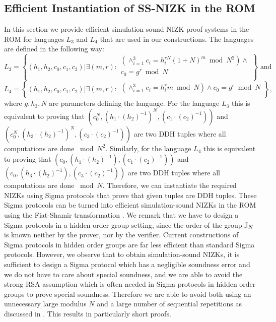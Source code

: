 \subsection{Efficient Instantiation of SS-NIZK in the ROM}\label{sec:nizk} 
In this section we provide efficient simulation sound NIZK proof systems in the ROM for languages $L_3$ and $L_4$ that are used in our constructions. The languages are defined in the following way:
\[
L_3 = \left\{(h_1, h_2, c_0, c_1, c_2)| \exists (m,r):
\begin{aligned}
       (\land_{i=1}^3 c_i = h_i^{rN}(1+N)^m \bmod N^2) \land \\
       c_0 = g^r \bmod N\\
    \end{aligned}
    \right\} \text{ and }
\]
\[
L_4 = \left\{(h_1, h_2, c_0, c_1, c_2)| \exists (m,r):
\begin{aligned}
       (\land_{i=1}^3 c_i = h_i^{r}m \bmod N) \land
       c_0 = g^r \bmod N\\
    \end{aligned}
    \right\}, 
\]
where $g, h_3, N$ are parameters defining the language. For the language $L_3$ this is equivalent to proving that $(c_0^N, (h_1\cdot (h_2)^{-1})^N , (c_1\cdot (c_2)^{-1}))$ and $(c_0^N, (h_3\cdot (h_2)^{-1})^N, (c_3\cdot (c_2)^{-1}))$ are two DDH tuples where all computations are done $\bmod N^2$. Similarly, for the language $L_4$ this is equivalent to proving that $(c_0, (h_1\cdot (h_2)^{-1}), (c_1\cdot (c_2)^{-1}))$ and $(c_0, (h_3\cdot (h_2)^{-1}), (c_3\cdot (c_2)^{-1}))$ are two DDH tuples where all computations are done $\bmod N$. Therefore, we can instantiate the required NIZKs using Sigma protocols that prove that given tuples are DDH tuples. These Sigma protocols can be turned into efficient simulation-sound NIZKs in the ROM using the Fiat-Shamir transformation \cite{C:FiaSha86}. We remark that we have to design a Sigma protocols in a hidden order group setting, since the order of the group $\mathbb{J}_N$ is known neither by the prover, nor by the verifier. Current constructions of Sigma protocols in hidden order groups are far less efficient than standard Sigma protocols. However, we observe that to obtain simulation-sound NIZKs, it is sufficient to design a Sigma protocol which has a negligible soundness error and we do not have to care about special soundness, and we are able to avoid the strong RSA assumption which is often needed in Sigma protocols in hidden order groups to prove special soundness. Therefore we are able to avoid both using an unnecessary large modulus $N$ and a large number of sequential repetitions as discussed in \cite{SPEED:BKSST}. 
This results in particularly short proofs. 

